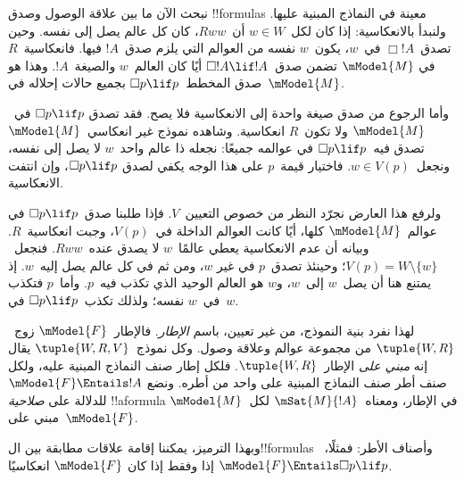 \documentclass[../../../include/open-logic-section]{subfiles}
\begin{document}


نبحث الآن ما بين علاقة الوصول وصدق !!{formula}s معينة في النماذج
المبنية عليها. ولنبدأ بالانعكاسية: إذا كان لكل~$w \in W$ أن~$Rww$،
كان كل عالم يصل إلى نفسه. وحين تصدق~$\Box !A$ في~$w$، يكون~$w$
نفسه من العوالم التي يلزم صدق~$!A$ فيها. فانعكاسية~$R$ في
$\mModel{M}$ تضمن صدق~$\Box !A \lif !A$ أيًا كان العالم~$w$
والصيغة~$!A$. وهذا هو صدق المخطط~$\Box p \lif p$ بجميع حالات
إحلاله في~$\mModel{M}$.

وأما الرجوع من صدق صيغة واحدة إلى الانعكاسية فلا يصح. فقد تصدق
$\Box p \lif p$ في~$\mModel{M}$ ولا تكون~$R$ انعكاسية.
وشاهده نموذج غير انعكاسي~$\mModel{M}$ تصدق فيه~$\Box p \lif p$
في عوالمه جميعًا: نجعله ذا عالم واحد~$w$ لا يصل إلى نفسه،
ونجعل~$w \in V(p)$. فاختيار قيمة~$p$ على هذا الوجه يكفي لصدق
$\Box p \lif p$، وإن انتفت الانعكاسية.

ولرفع هذا العارض نجرّد النظر من خصوص التعيين~$V$.
فإذا طلبنا صدق~$\Box p \lif p$ في عوالم~$\mModel{M}$ كلها،
أيًا كانت العوالم الداخلة في~$V(p)$، وجبت انعكاسية~$R$.
وبيانه أن عدم الانعكاسية يعطي عالمًا~$w$ لا يصدق عنده~$Rww$.
فنجعل~$V(p) = W \setminus \{w\}$؛ وحينئذ تصدق~$p$ في غير
$w$، ومن ثم في كل عالم يصل إليه~$w$. إذ يمتنع هنا أن يصل~$w$
إلى~$w$، و$w$ هو العالم الوحيد الذي تكذب فيه~$p$.
وأما~$p$ فتكذب في~$w$ نفسه؛ ولذلك تكذب~$\Box p \lif p$ في~$w$.

لهذا نفرد بنية النموذج، من غير تعيين، باسم \emph{الإطار}.
فالإطار~$\mModel{F}$ زوج~$\tuple{W, R}$ من مجموعة عوالم وعلاقة
وصول. وكل نموذج~$\tuple{W, R, V}$ يقال إنه \emph{مبني على}
الإطار~$\tuple{W, R}$. فلكل إطار صنف النماذج المبنية عليه،
ولكل صنف أطر صنف النماذج المبنية على واحد من أطره. ونضع
$\mModel{F} \Entails !A$ للدلالة على \emph{صلاحية} !!a{formula}
في الإطار، ومعناه~$\mSat{M}{!A}$ لكل~$\mModel{M}$ مبني
على~$\mModel{F}$.

وبهذا الترميز، يمكننا إقامة علاقات مطابقة بين ال!!{formula}s وأصناف
الأطر: فمثلًا،~$\mModel{F} \Entails \Box p \lif p$ إذا وفقط إذا كان
$\mModel{F}$ انعكاسيًا.
\end{document}
